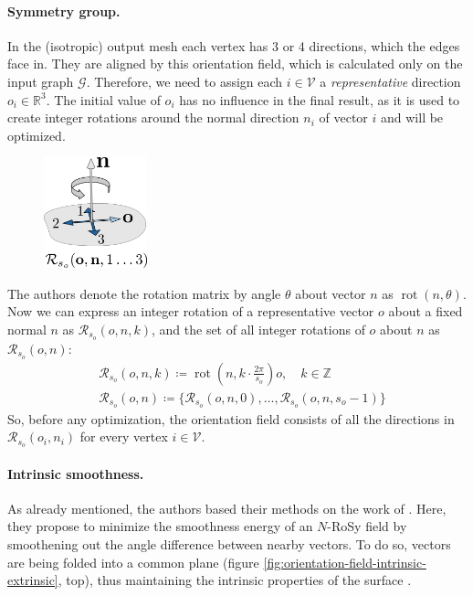 \documentclass{ACGSeminar}
\DeclareMathOperator{\rot}{rot}
\begin{document}
\paragraph{Symmetry group.}
In the (isotropic) output mesh each vertex has 3 or 4 directions, which the edges face in. They are aligned by this orientation field, which is calculated only on the input graph $\mathcal{G}$. Therefore, we need to assign each $i \in \mathcal{V}$ a \textit{representative} direction $o_i \in \mathbb{R}^3$. The initial value of $o_i$ has no influence in the final result, as it is used to create integer rotations around the normal direction $n_i$ of vector $i$ and will be optimized.\bigskip

\begin{figure}
	\includegraphics[width=3cm]{img/integer-rotation.png}\par
	\label{fig:integer-rotation}
\end{figure}

The authors denote the rotation matrix by angle $\theta$ about vector $n$ as $\rot(n, \theta)$. Now we can express an integer rotation of a representative vector $o$ about a fixed normal $n$ as $\mathcal{R}_{s_o}(o,n,k)$, and the set of all integer rotations of $o$ about $n$ as $\mathcal{R}_{s_o}(o,n)$:
\begin{equation*}
\begin{split}
	& \mathcal{R}_{s_o}(o,n,k) \coloneqq \rot(n, k \cdot \frac{2\pi}{s_o})o, \quad k \in \mathbb{Z} \\
	& \mathcal{R}_{s_o}(o,n) \coloneqq \{\mathcal{R}_{s_o}(o,n,0), \dots, \mathcal{R}_{s_o}(o,n,s_o-1)\}
\end{split}
\end{equation*}
So, before any optimization, the orientation field consists of all the directions in $\mathcal{R}_{s_o}(o_i, n_i)$ for every vertex $i \in \mathcal{V}$.

\paragraph{Intrinsic smoothness.}
As already mentioned, the authors based their methods on the work of \cite{ray2008n,bommes2009mixed}. Here, they propose to minimize the smoothness energy of an $N$-RoSy field by smoothening out the angle difference between nearby vectors. To do so, vectors are being folded into a common plane (figure \ref{fig:orientation-field-intrinsic-extrinsic}, top), thus maintaining the intrinsic properties of the surface \cite{jakob2015instant}.\bigskip
\end{document}
